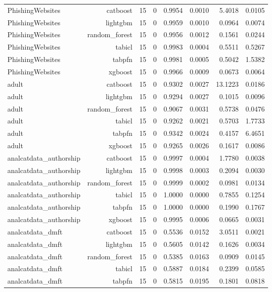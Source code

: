 \begin{table}[htbp]
\begin{tabular}{lrrrrrrr}
PhishingWebsites & catboost & 15 & 0 & 0.9954 & 0.0010 & 5.4018 & 0.0105 \\
PhishingWebsites & lightgbm & 15 & 0 & 0.9959 & 0.0010 & 0.0964 & 0.0074 \\
PhishingWebsites & random\_forest & 15 & 0 & 0.9956 & 0.0012 & 0.1561 & 0.0244 \\
PhishingWebsites & tabicl & 15 & 0 & 0.9983 & 0.0004 & 0.5511 & 0.5267 \\
PhishingWebsites & tabpfn & 15 & 0 & 0.9981 & 0.0005 & 0.5042 & 1.5382 \\
PhishingWebsites & xgboost & 15 & 0 & 0.9966 & 0.0009 & 0.0673 & 0.0064 \\
adult & catboost & 15 & 0 & 0.9302 & 0.0027 & 13.1223 & 0.0186 \\
adult & lightgbm & 15 & 0 & 0.9294 & 0.0027 & 0.1015 & 0.0096 \\
adult & random\_forest & 15 & 0 & 0.9067 & 0.0031 & 0.5738 & 0.0476 \\
adult & tabicl & 15 & 0 & 0.9262 & 0.0021 & 0.5703 & 1.7733 \\
adult & tabpfn & 15 & 0 & 0.9342 & 0.0024 & 0.4157 & 6.4651 \\
adult & xgboost & 15 & 0 & 0.9265 & 0.0026 & 0.1617 & 0.0086 \\
analcatdata\_authorship & catboost & 15 & 0 & 0.9997 & 0.0004 & 1.7780 & 0.0038 \\
analcatdata\_authorship & lightgbm & 15 & 0 & 0.9998 & 0.0003 & 0.2094 & 0.0030 \\
analcatdata\_authorship & random\_forest & 15 & 0 & 0.9999 & 0.0002 & 0.0981 & 0.0134 \\
analcatdata\_authorship & tabicl & 15 & 0 & 1.0000 & 0.0000 & 0.7855 & 0.1254 \\
analcatdata\_authorship & tabpfn & 15 & 0 & 1.0000 & 0.0000 & 0.1990 & 0.1767 \\
analcatdata\_authorship & xgboost & 15 & 0 & 0.9995 & 0.0006 & 0.0665 & 0.0031 \\
analcatdata\_dmft & catboost & 15 & 0 & 0.5536 & 0.0152 & 3.0511 & 0.0021 \\
analcatdata\_dmft & lightgbm & 15 & 0 & 0.5605 & 0.0142 & 0.1626 & 0.0034 \\
analcatdata\_dmft & random\_forest & 15 & 0 & 0.5385 & 0.0163 & 0.0909 & 0.0145 \\
analcatdata\_dmft & tabicl & 15 & 0 & 0.5887 & 0.0184 & 0.2399 & 0.0585 \\
analcatdata\_dmft & tabpfn & 15 & 0 & 0.5815 & 0.0195 & 0.1801 & 0.0818 \\

\end{tabular}
\end{table}
